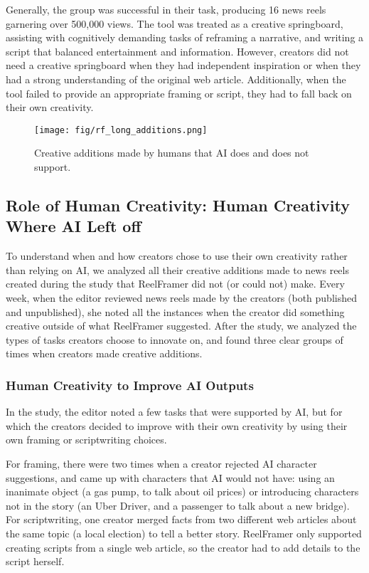 Generally, the group was successful in their task, producing 16 news reels garnering over 500,000 views. 
The tool was treated as a creative springboard, assisting with cognitively demanding tasks of reframing a narrative, and writing a script that balanced entertainment and information. 
However, creators did not need a creative springboard when they had independent inspiration or when they had a strong understanding of the original web article. 
Additionally, when the tool failed to provide an appropriate framing or script, they had to fall back on their own creativity.

\begin{figure*}
\centering
\texttt{[image: fig/rf\_long\_additions.png]}
\caption{Creative additions made by humans that AI does and does not support.}
\label{fig:creative_adaptions}
\end{figure*}

\subsection{Role of Human Creativity: Human Creativity Where AI Left off}
\label{sec:creativity}

To understand when and how creators chose to use their own creativity rather than relying on AI, we analyzed all their creative additions made to news reels created during the study that ReelFramer did not (or could not) make.
Every week, when the editor reviewed news reels made by the creators (both published and unpublished), she noted all the instances when the creator did something creative outside of what ReelFramer suggested. 
After the study, we analyzed the types of tasks creators choose to innovate on, and found three clear groups of times when creators made creative additions. 

\subsubsection{Human Creativity to Improve AI Outputs} In the study, the editor noted a few tasks that were supported by AI, but for which the creators decided to improve with their own creativity by using their own framing or scriptwriting choices.

For framing, there were two times when a creator rejected AI character suggestions, and came up with characters that AI would not have: using an inanimate object (a gas pump, to talk about oil prices) or introducing characters not in the story (an Uber Driver, and a passenger to talk about a new bridge). 
For scriptwriting, one creator merged facts from two different web articles about the same topic (a local election) to tell a better story. 
ReelFramer only supported creating scripts from a single web article, so the creator had to add details to the script herself. 

